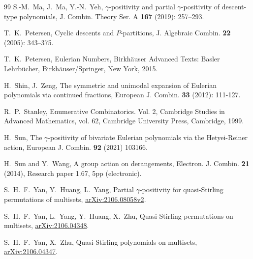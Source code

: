 \documentclass[11pt,reqno]{amsart}
\numberwithin{equation}{section}
\theoremstyle{plain}
\theoremstyle{definition}
\begin{document}
\begin{thebibliography}{99}
 S.-M.~Ma, J.~Ma, Y.-N.~Yeh, $\gamma$-positivity and partial $\gamma$-positivity of descent-type polynomials, J. Combin. Theory Ser. A {\bf 167} (2019): 257--293.



 T.~K.~Petersen, Cyclic descents and $P$-partitions, J. Algebraic Combin. {\bf 22} (2005): 343--375. 

 T.~K.~Petersen, Eulerian Numbers, Birkh\"auser Advanced Texts: Basler Lehrb\"ucher, Birkh\"auser/Springer, New York, 2015.

 H.~Shin, J.~Zeng, The symmetric and unimodal expansion of Eulerian polynomials via continued fractions, European J. Combin. {\bf 33} (2012): 111-127.

 R.~P.~Stanley, Enumerative Combinatorics. Vol. 2, Cambridge Studies in Advanced Mathematics, vol. 62, Cambridge University Press, Cambridge, 1999.

 H.~Sun, The $\gamma$-positivity of bivariate Eulerian polynomials via the Hetyei-Reiner action, European J. Combin. {\bf 92} (2021) 103166.

 H.~Sun and Y.~Wang, A group action on derangements, Electron. J. Combin. {\bf 21} (2014), Research paper 1.67, 5pp (electronic).

 S.~H.~F.~Yan, Y.~Huang, L.~Yang, Partial $\gamma$-positivity for quasi-Stirling permutations of multisets, \href{https://arxiv.org/abs/2106.08058v2}{arXiv:2106.08058v2}.

 S.~H.~F.~Yan, L.~Yang, Y.~Huang, X.~Zhu, Quasi-Stirling permutations on multisets, \href{https://arxiv.org/abs/2106.04348}{arXiv:2106.04348}.

 S.~H.~F.~Yan, X.~Zhu, Quasi-Stirling polynomials on multisets, \href{https://arxiv.org/abs/2106.04347}{arXiv:2106.04347}.





\end{thebibliography}
\end{document}
